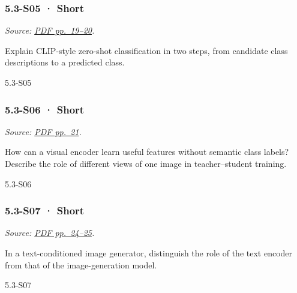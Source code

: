 \noindent\begin{minipage}{\linewidth}

\subsubsection{5.3-S05 · Short}\label{s05-short-14}

\emph{Source:
\href{../Lecture\%20Slides/5.3.\%20Foundation\%20models.pdf\#page=19}{PDF
pp.~19--20}.}

Explain CLIP-style zero-shot classification in two steps, from candidate
class descriptions to a predicted class.

\begin{solution}[20mm]{5.3-S05}

\end{solution}
\end{minipage}\par\medskip

\noindent\begin{minipage}{\linewidth}

\subsubsection{5.3-S06 · Short}\label{s06-short-14}

\emph{Source:
\href{../Lecture\%20Slides/5.3.\%20Foundation\%20models.pdf\#page=21}{PDF
pp.~21}.}

How can a visual encoder learn useful features without semantic class
labels? Describe the role of different views of one image in
teacher--student training.

\begin{solution}[20mm]{5.3-S06}

\end{solution}
\end{minipage}\par\medskip

\noindent\begin{minipage}{\linewidth}

\subsubsection{5.3-S07 · Short}\label{s07-short-14}

\emph{Source:
\href{../Lecture\%20Slides/5.3.\%20Foundation\%20models.pdf\#page=24}{PDF
pp.~24--25}.}

In a text-conditioned image generator, distinguish the role of the text
encoder from that of the image-generation model.

\begin{solution}[20mm]{5.3-S07}

\end{solution}
\end{minipage}\par\medskip

